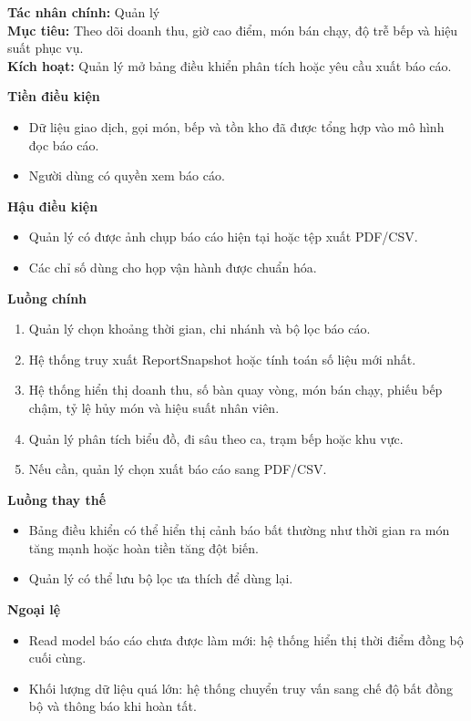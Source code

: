 \documentclass[11pt,a4paper]{article}
\begin{document}
    \begin{usecasebox}[title={UC-REP-01 --- Xem báo cáo doanh thu và vận hành}]
    \textbf{Tác nhân chính:} Quản lý\\
    \textbf{Mục tiêu:} Theo dõi doanh thu, giờ cao điểm, món bán chạy, độ trễ bếp và hiệu suất phục vụ.\\
    \textbf{Kích hoạt:} Quản lý mở bảng điều khiển phân tích hoặc yêu cầu xuất báo cáo.

    \medskip
    \textbf{Tiền điều kiện}
    \begin{itemize}[leftmargin=1.8em]
  \item Dữ liệu giao dịch, gọi món, bếp và tồn kho đã được tổng hợp vào mô hình đọc báo cáo.
  \item Người dùng có quyền xem báo cáo.
\end{itemize}

    \textbf{Hậu điều kiện}
    \begin{itemize}[leftmargin=1.8em]
  \item Quản lý có được ảnh chụp báo cáo hiện tại hoặc tệp xuất PDF/CSV.
  \item Các chỉ số dùng cho họp vận hành được chuẩn hóa.
\end{itemize}

    \textbf{Luồng chính}
    \begin{enumerate}[leftmargin=1.8em]
  \item Quản lý chọn khoảng thời gian, chi nhánh và bộ lọc báo cáo.
  \item Hệ thống truy xuất \textsf{ReportSnapshot} hoặc tính toán số liệu mới nhất.
  \item Hệ thống hiển thị doanh thu, số bàn quay vòng, món bán chạy, phiếu bếp chậm, tỷ lệ hủy món và hiệu suất nhân viên.
  \item Quản lý phân tích biểu đồ, đi sâu theo ca, trạm bếp hoặc khu vực.
  \item Nếu cần, quản lý chọn xuất báo cáo sang PDF/CSV.
\end{enumerate}

    \textbf{Luồng thay thế}
    \begin{itemize}[leftmargin=1.8em]
  \item Bảng điều khiển có thể hiển thị cảnh báo bất thường như thời gian ra món tăng mạnh hoặc hoàn tiền tăng đột biến.
  \item Quản lý có thể lưu bộ lọc ưa thích để dùng lại.
\end{itemize}

    \textbf{Ngoại lệ}
    \begin{itemize}[leftmargin=1.8em]
  \item Read model báo cáo chưa được làm mới: hệ thống hiển thị thời điểm đồng bộ cuối cùng.
  \item Khối lượng dữ liệu quá lớn: hệ thống chuyển truy vấn sang chế độ bất đồng bộ và thông báo khi hoàn tất.
\end{itemize}


\end{usecasebox}
\end{document}
